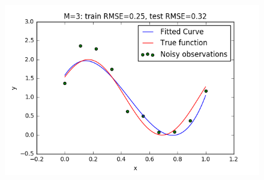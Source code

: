 \documentclass[a4paper]{article}
\begin{document}
\begin{figure}[h!]
\begin{multicols}{2}
    \includegraphics[width=\linewidth]{Images/curvefit_m3_n_10.png}\par
\end{multicols}
\end{figure}
\end{document}
